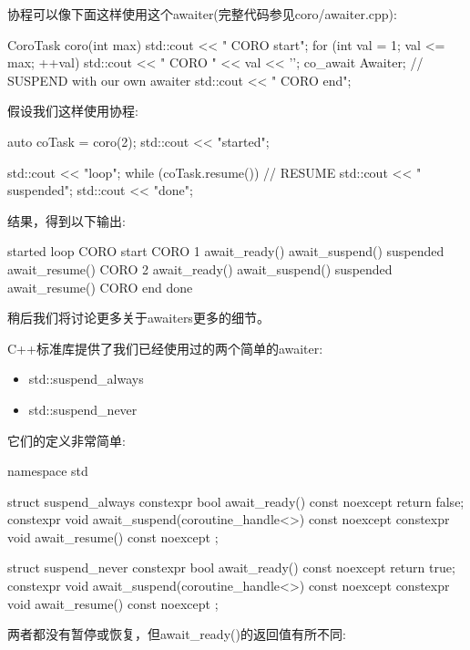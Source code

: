 协程可以像下面这样使用这个awaiter(完整代码参见coro/awaiter.cpp):

\begin{cpp}
CoroTask coro(int max)
{
	std::cout << "   CORO start\n";
	for (int val = 1; val <= max; ++val) {
		std::cout << "   CORO " << val << '\n';
		co_await Awaiter{}; // SUSPEND with our own awaiter
	}
	std::cout << "   CORO end\n";
}
\end{cpp}

假设我们这样使用协程:

\begin{cpp}
auto coTask = coro(2);
std::cout << "started\n";

std::cout << "loop\n";
while (coTask.resume()) { // RESUME
	std::cout << " suspended\n";
}
std::cout << "done\n";
\end{cpp}

结果，得到以下输出:

\begin{shell}
started
loop
  CORO start
  CORO 1
    await_ready()
    await_suspend()
  suspended
    await_resume()
  CORO 2
    await_ready()
    await_suspend()
  suspended
    await_resume()
  CORO end
done
\end{shell}

稍后我们将讨论更多关于awaiters更多的细节。


C++标准库提供了我们已经使用过的两个简单的awaiter:

\begin{itemize}
\item 
std::suspend\_always

\item 
std::suspend\_never
\end{itemize}

它们的定义非常简单:

\begin{cpp}
namespace std {
	struct suspend_always {
		constexpr bool await_ready() const noexcept { return false; }
		constexpr void await_suspend(coroutine_handle<>) const noexcept { }
		constexpr void await_resume() const noexcept { }
	};
	
	struct suspend_never {
		constexpr bool await_ready() const noexcept { return true; }
		constexpr void await_suspend(coroutine_handle<>) const noexcept { }
		constexpr void await_resume() const noexcept { }
	};
}
\end{cpp}

两者都没有暂停或恢复，但await\_ready()的返回值有所不同:

